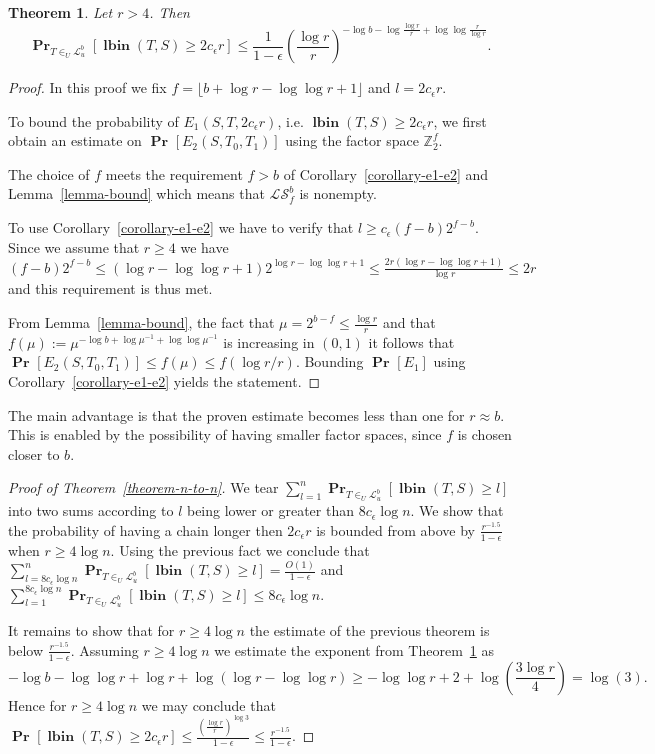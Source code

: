 \documentclass{article}
\newcommand{\lbin}[2]{\operatorname{\mathbf{lbin}}({#1}, {#2})}
\newcommand{\vecspace}[2]{\mathbb{Z}_{#1}^{#2}}
\newcommand{\binvecspace}[1]{\vecspace{2}{#1}}
\newcommand{\linearmaps}[2]{\mathcal{L}_{#1}^{#2}}
\newcommand{\surjectivelinearmaps}[2]{\mathcal{LS}_{#1}^{#2}}
\newcommand{\probs}[2]{\operatorname{\mathbf{Pr}}_{{#1}}\left[{#2}\right]}
\newcommand{\prob}[1]{\probs{}{#1}}
\newtheorem{theorem}{Theorem}
\begin{document}
\begin{theorem}
\label{theorem-prob-distribution-bound}
Let $r > 4$. Then
\[
\probs{T \in_U \linearmaps{u}{b}}{\lbin{T}{S} \geq 2 c_\epsilon r} \leq \frac{1}{1 - \epsilon}\left(\frac{\log r}{r}\right)^{-\log b - \log \frac{\log r}{r} + \log \log \frac{r}{\log r}}.
\]
\end{theorem}
\begin{proof}
In this proof we fix $f = \lfloor b + \log r - \log \log r + 1 \rfloor$ and $l = 2c_\epsilon r$.

To bound the probability of $E_1(S, T, 2 c_\epsilon r)$, i.e. $\lbin{T}{S} \geq 2 c_\epsilon r$, we first obtain an estimate on $\prob{E_2(S, T_0, T_1)}$ using the factor space $\binvecspace{f}$. 

The choice of $f$ meets the requirement $f > b$ of Corollary~\ref{corollary-e1-e2} and Lemma~\ref{lemma-bound} which means that $\surjectivelinearmaps{f}{b}$ is nonempty.

To use Corollary~\ref{corollary-e1-e2} we have to verify that $l \geq c_\epsilon (f - b)2^{f - b}$.
Since we assume that $r \geq 4$ we have $(f - b)2^{f - b} \leq (\log r - \log \log r + 1)2^{\log r - \log \log r + 1} \leq \frac{2r(\log r - \log \log r + 1)}{\log r} \leq 2r$ and this requirement is thus met.

From Lemma~\ref{lemma-bound}, the fact that $\mu = 2^{b - f} \leq \frac{\log r}{r}$ and that $f(\mu) := \mu ^ {- \log b + \log \mu^{-1} + \log \log \mu^{-1}}$ is increasing in $(0, 1)$ it follows that $\prob{E_2(S, T_0, T_1)} \leq f(\mu) \leq f(\log r/r)$.
Bounding $\prob{E_1}$ using Corollary~\ref{corollary-e1-e2} yields the statement.
\end{proof}

The main advantage is that the proven estimate becomes less than one for $r \approx b$. 
This is enabled by the possibility of having smaller factor spaces, since $f$ is chosen closer to $b$.

\begin{proof}[Proof of Theorem~\ref{theorem-n-to-n}]
We tear $\sum_{l = 1}^{n} \probs{T\in_U\linearmaps{u}{b}}{\lbin{T}{S} \geq l}$ into two sums according to $l$ being lower or greater than $8c_\epsilon \log n$.
We show that the probability of having a chain longer then $2 c_\epsilon r$ is bounded from above by $\frac{r^{-1.5}}{1-\epsilon}$ when $r \geq 4\log n$.
Using the previous fact we conclude that $\sum_{l = 8c_\epsilon \log n}^{n} \probs{T\in_U\linearmaps{u}{b}}{\lbin{T}{S} \geq l} = \frac{O(1)}{1-\epsilon}$ and $\sum_{l = 1}^{8c_\epsilon \log n} \probs{T\in_U\linearmaps{u}{b}}{\lbin{T}{S} \geq l} \leq 8c_\epsilon \log n$.

It remains to show that for $r \geq 4 \log n$ the estimate of the previous theorem is below $\frac{r^{-1.5}}{1-\epsilon}$.
Assuming $r \geq 4 \log n$ we estimate the exponent from Theorem~\ref{theorem-prob-distribution-bound} as
\[
-\log b - \log \log r + \log r + \log (\log r - \log \log r) \geq -\log \log r + 2 + \log \left(\frac{3\log r}{4}\right) = \log(3).
\]
Hence for $r \geq 4\log n$ we may conclude that $\prob{\lbin{T}{S} \geq 2c_\epsilon r} \leq \frac{\left(\frac{\log r}{r}\right)^{\log 3}}{1-\epsilon} \leq \frac{r^{-1.5}}{1-\epsilon}$.
\end{proof}
\end{document}
